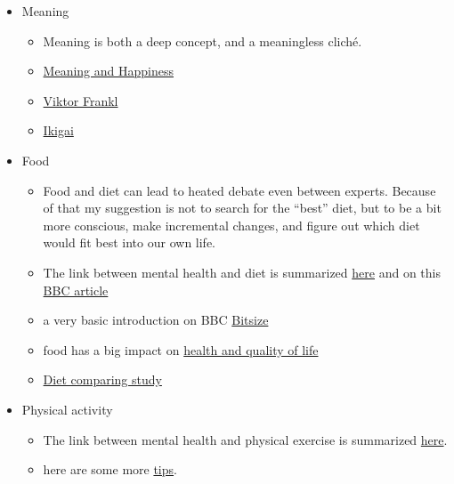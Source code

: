 \documentclass{article}
\begin{document}
\begin{itemize}
    \item Meaning
    \begin{itemize}
        \item Meaning is both a deep concept, and a meaningless cliché.
        \item \href{https://greatergood.berkeley.edu/article/item/happy_life_different_from_meaningful_life}{Meaning and Happiness}
        \item \href{https://www.brainpickings.org/2013/03/26/viktor-frankl-mans-search-for-meaning/}{Viktor Frankl} 
        \item \href{https://en.wikipedia.org/wiki/Ikigai}{Ikigai}
    \end{itemize}
    \item Food
    \begin{itemize}
        \item Food and diet can lead to heated debate even between experts. Because of that my suggestion is not to search for the ``best'' diet, but to be a bit more conscious, make incremental changes, and figure out which diet would fit best into our own life.
        \item The link between mental health and diet is summarized \href{https://www.mentalhealth.org.uk/a-to-z/d/diet-and-mental-health}{here} and on this \href{https://www.bbc.co.uk/food/articles/diet_wellbeing}{BBC article}
        \item a very basic introduction on BBC \href{https://www.bbc.co.uk/bitesize/topics/zf339j6/articles/zmwvgdm}{Bitsize}
        \item food has a big impact on \href{https://www.healthline.com/nutrition/healthy-eating-for-beginners}{health and quality of life}
        \item \href{https://www.annualreviews.org/doi/full/10.1146/annurev-publhealth-032013-182351}{Diet comparing study}
    \end{itemize}
    \item Physical activity
    \begin{itemize}
        \item The link between mental health and physical exercise is summarized \href{https://www.mentalhealth.org.uk/publications/how-to-using-exercise}{here}.
        \item here are some more \href{https://www.mayoclinic.org/diseases-conditions/depression/in-depth/depression-and-exercise/art-20046495}{tips}.
    \end{itemize}

\end{itemize}
\end{document}
